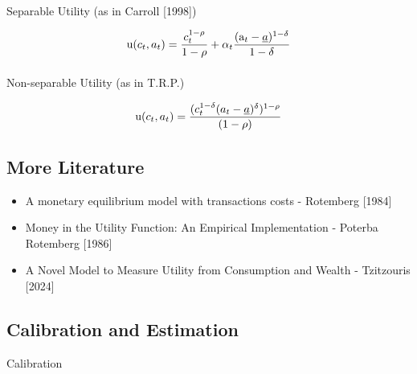 \documentclass[
  letterpaper,
  DIV=11,
  numbers=noendperiod]{scrartcl}
\makeatletter
\let\oldparagraph\paragraph
\renewcommand{\paragraph}{
    \@ifstar
      \xxxParagraphStar
      \xxxParagraphNoStar
  }
\newcommand{\xxxParagraphStar}[1]{\oldparagraph*{#1}\mbox{}}
\newcommand{\xxxParagraphNoStar}[1]{\oldparagraph{#1}\mbox{}}
\makeatother
\begin{document}
\paragraph{Separable Utility (as in Carroll
{[}1998{]})}\label{separable-utility-as-in-carroll-1998}

\[\begin{equation}
\mathrm{u}(c_{t}, a_{t}) = \frac{c_{t}^{1-\rho}}{1-\rho} + \alpha_{t} \frac{(\mathrm{a}_{t} - \underline{a})^{1-\delta}}{1-\delta}
\end{equation}\]

\paragraph{Non-separable Utility (as in
T.R.P.)}\label{non-separable-utility-as-in-t.r.p.}

\[\begin{equation}
\mathrm{u}(c_{t}, a_{t}) = \frac{(c_{t}^{1-\delta} (a_{t} - \underline{a})^\delta)^{1-\rho}}{(1-\rho)}
\end{equation}\]

\subsection{More Literature}\label{more-literature}

\begin{itemize}
\item
  A monetary equilibrium model with transactions costs - Rotemberg
  {[}1984{]}
\item
  Money in the Utility Function: An Empirical Implementation - Poterba
  Rotemberg {[}1986{]}
\item
  A Novel Model to Measure Utility from Consumption and Wealth -
  Tzitzouris {[}2024{]}
\end{itemize}

\subsection{Calibration and
Estimation}\label{calibration-and-estimation}

Calibration
\end{document}
